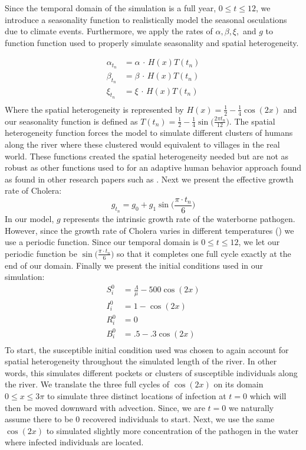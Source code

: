 Since the temporal domain of the simulation is a full year, $0 \leq t \leq 12$, we introduce a seasonality function to realistically model the seasonal osculations due to climate events. Furthermore, we apply the rates of $\alpha, \beta, \xi, $ and $g$ to function function used to properly simulate seasonality and spatial heterogeneity.  

\begin{align*}
    \alpha_{t_n} &= \alpha  \, \cdot \, H(x)T(t_n) \\
    \beta_{t_n} &= \beta  \, \cdot \, H(x)T(t_n) \\ 
    \xi_{t_n} &= \xi  \, \cdot \, H(x)T(t_n) \\
\end{align*}
Where the spatial heterogeneity is represented by $H(x) = \frac{1}{2} - \frac{1}{4} \cos(2x)$ and our seasonality function is defined as $T(t_n) =\frac{1}{2} - \frac{1}{4} \sin\big(\frac{2 \pi t_n}{12}\big) $. The spatial heterogeneity function forces the model to simulate different clusters of humans along the river where these clustered would equivalent to villages in the real world. These functions created the spatial heterogeneity needed but are not as robust as other functions used to for an adaptive human behavior approach found as found in other research papers such as \cite{wang2015influence}. Next we present the effective growth rate of Cholera:
\begin{equation*}
    g_{t_n} = g_0 + g_1 \sin\big(\frac{\pi \cdot t_n}{6}\big)
\end{equation*}
In our model, $g$ represents the intrinsic growth rate of the waterborne pathogen. However, since the growth rate of Cholera varies in different temperatures (\cite{constantin_de_magny_cholera_2009}) we use a periodic function. Since our temporal domain is $0 \leq t \leq 12$, we let our periodic function be $\sin\big(\frac{\pi \cdot t_n}{6}\big)$ so that it completes one full cycle exactly at the end of our domain. 
Finally we present the initial conditions used in our simulation: 
\begin{align}
    S^0_{i} &=  \frac{\Lambda}{\mu} - 500 \cos(2x)\\
    I^0_{i} &=  1 - \cos(2x)\\
    R^0_{i} &=  0\\
    B^0_{i} &=  .5 - .3 \cos(2x)\\
\end{align}
To start, the susceptible initial condition used was chosen to again account for spatial heterogeneity throughout the simulated length of the river. In other words, this simulates different pockets or clusters of susceptible individuals along the river. We translate the three full cycles of $\cos(2x)$ on its domain $0 \leq x \leq 3\pi$ to simulate three distinct locations of infection at $t = 0$ which will then be moved downward with advection. Since, we are $t=0$ we naturally assume there to be 0 recovered individuals to start. Next, we use the same $\cos(2x)$ to simulated slightly more concentration of the pathogen in the water where infected individuals are located. 
